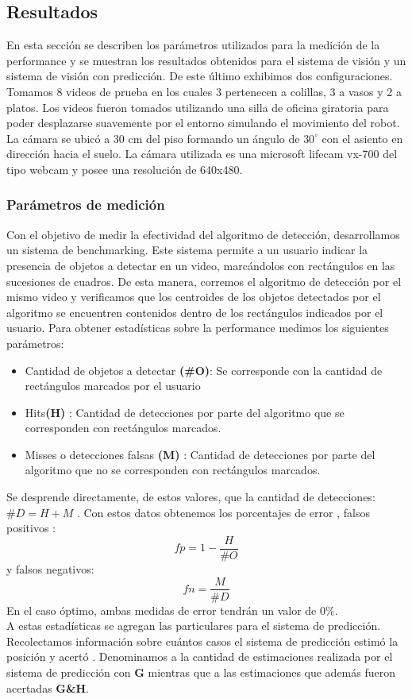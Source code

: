 	
	
\subsection{Resultados}
En esta sección se describen los parámetros utilizados para la 
medición de la performance y se muestran los resultados obtenidos para 
el sistema de visión y un sistema de visión con predicción. De este 
último exhibimos dos configuraciones. Tomamos 8 videos de prueba en los cuales 3 pertenecen a 
colillas, 3 a vasos y 2 a platos. Los videos fueron tomados utilizando 
una silla de oficina giratoria para poder desplazarse suavemente por 
el entorno simulando el movimiento del robot. La cámara se ubicó a 30 
cm del piso formando un ángulo de $30^{\circ}$ con el asiento  en dirección 
hacia el suelo. La cámara utilizada es una microsoft lifecam vx-700 del tipo webcam y posee una 
resolución de 640x480.

\subsubsection{Parámetros de medición}
Con el objetivo de  medir la efectividad del algoritmo de detección, desarrollamos un sistema de benchmarking. Este sistema permite
a un usuario indicar la presencia de objetos a detectar en un video, marcándolos con rectángulos en las sucesiones de cuadros. De esta
manera, corremos el algoritmo de detección por el mismo video y verificamos que los centroides de los objetos detectados por el algoritmo 
se encuentren contenidos dentro de los rectángulos indicados por el 
usuario. Para obtener estadísticas sobre la performance  
medimos los siguientes parámetros:
\begin{itemize}
\item { Cantidad de objetos a detectar \textbf{(\#O)}: Se corresponde con la cantidad de rectángulos marcados por el usuario}
\item { Hits\textbf{(H)} : Cantidad de detecciones por parte del algoritmo que se corresponden con rectángulos marcados.}
\item { Misses o detecciones falsas \textbf{(M)} : Cantidad de detecciones por parte del algoritmo que no se corresponden con rectángulos marcados.}
\end{itemize}
Se desprende directamente, de estos valores, que la cantidad de detecciones: 
\textbf{$\#D=H+M$} .
Con estos datos obtenemos los porcentajes de error , falsos positivos : 
\[
	fp=1 - \frac{H}{\# O}
\]
y falsos negativos:
\[
	fn=\frac{M}{\# D}
\]
En el caso óptimo, ambas medidas de error tendrán un valor de $0\%$.  \\
\indent A estas estadísticas se agregan las particulares para el sistema de predicción. Recolectamos información sobre
cuántos casos el sistema de predicción estimó la posición y acertó . Denominamos
a la cantidad de estimaciones realizada por el sistema de predicción 
con \textbf{G} mientras que a las estimaciones que además fueron 
acertadas \textbf{G\&H}.

